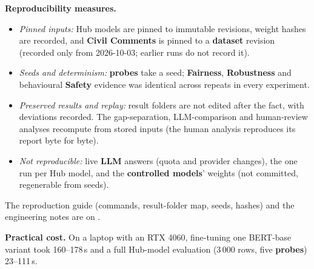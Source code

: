 \textbf{Reproducibility measures.}
\begin{itemize}
\item \emph{Pinned inputs:} Hub models are pinned to immutable revisions, weight hashes are recorded, and \textbf{Civil Comments} is pinned to a \textbf{dataset} revision (recorded only from 2026-10-03; earlier runs do not record it).
\item \emph{Seeds and determinism:} \textbf{probes} take a seed; \textbf{Fairness}, \textbf{Robustness} and behavioural \textbf{Safety} evidence was identical across repeats in every experiment.
\item \emph{Preserved results and replay:} result folders are not edited after the fact, with deviations recorded. The gap-separation, LLM-comparison and human-review analyses recompute from stored inputs (the human analysis reproduces its report byte for byte).
\item \emph{Not reproducible:} live \textbf{LLM} answers (quota and provider changes), the one run per Hub model, and the \textbf{controlled models}' weights (not committed, regenerable from seeds).
\end{itemize}
The reproduction guide  (commands, result-folder map, seeds, hashes) and the engineering notes  are on .

\textbf{Practical cost.} On a laptop with an RTX 4060, fine-tuning one BERT-base variant took 160--178\,s and a full Hub-model evaluation (3\,000 rows, five \textbf{probes}) 23--111\,s.
